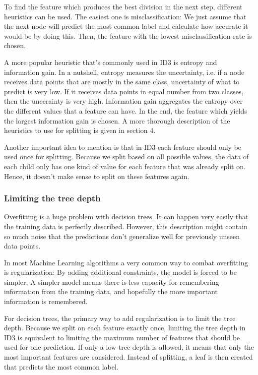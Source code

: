\documentclass[a4paper]{article}
\begin{document}
To find the feature which produces the best division in the next step, different heuristics can be used. The easiest one is misclassification: We just assume that the next node will predict the most common label and calculate how accurate it would be by doing this. Then, the feature with the lowest misclassification rate is chosen.

A more popular heuristic that's commonly used in ID3 is entropy and information gain. In a nutshell, entropy measures the uncertainty, i.e. if a node receives data points that are mostly in the same class, uncertainty of what to predict is very low. If it receives data points in equal number from two classes, then the uncerainty is very high. Information gain aggregates the entropy over the different values that a feature can have. In the end, the feature which yields the largest information gain is chosen. A more thorough description of the heuristics to use for splitting is given in section 4.

Another important idea to mention is that in ID3 each feature should only be used once for splitting. Because we split based on all possible values, the data of each child only has one kind of value for each feature that was already split on. Hence, it doesn't make sense to split on these features again.

\subsubsection{Limiting the tree depth}

Overfitting is a huge problem with decision trees. It can happen very easily that the training data is perfectly described. However, this description might contain so much noise that the predictions don't generalize well for previously unseen data points.

In most Machine Learning algorithms a very common way to combat overfitting is regularization: By adding additional constraints, the model is forced to be simpler. A simpler model means there is less capacity for remembering information from the training data, and hopefully the more important information is remembered.

For decision trees, the primary way to add regularization is to limit the tree depth. Because we split on each feature exactly once, limiting the tree depth in ID3 is equivalent to limiting the maximum number of features that should be used for one prediction. If only a low tree depth is allowed, it means that only the most important features are considered. Instead of splitting, a leaf is then created that predicts the most common label.
\end{document}
